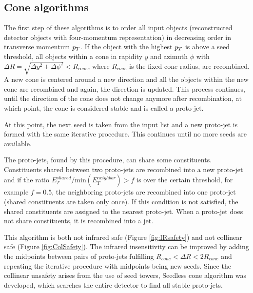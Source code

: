 \subsection{Cone algorithms}

The first step of these algorithms is to order all input objects (reconstructed
detector objects with four-momentum representation) in decreasing order in
transverse momentum $p_{T}$. If the object with the highest $p_{T}$ is above a
seed threshold, all objects within a cone in rapidity $y$ and azimuth
$\phi$ with $\Delta R = \sqrt{\Delta y^2 + \Delta \phi^2} < R_{cone}$, where
$R_{cone}$ is the fixed cone radius, are recombined.
A new cone is centered around a new direction and all the objects within the new
cone are recombined and again, the direction is updated. This process continues,
until the direction of the cone does not change anymore after recombination, at
which point, the cone is considered stable and is called a proto-jet. 

At this point, the next seed is taken from the input list and a new proto-jet is
formed with the same iterative procedure. This continues until no more seeds are
available. 

The proto-jets, found by this procedure, can share some constituents. Constituents
shared between two proto-jets are recombined into a new proto-jet and if the ratio
$E_T^{shared} / \text{min} ( E_T^{neighbor} ) > f$ is over the certain
threshold, for example $f = 0.5$, the neighboring proto-jets are recombined into
one proto-jet (shared constituents are taken only once). If this condition is
not satisfied, the shared constituents are assigned to the nearest proto-jet.
When a proto-jet does not share constituents, it is recombined into a jet.

This algorithm is both not infrared safe (Figure \ref{fig:IRsafety}) and not
collinear safe (Figure \ref{fig:ColSafety}). The infrared insensitivity can be
improved by adding the midpoints between pairs of proto-jets fulfilling
$R_{cone} < \Delta R < 2 R_{cone}$ and repeating the iterative procedure with
midpoints being new seeds. Since the collinear unsafety arises from the use of
seed towers, Seedless cone algorithm was developed, which searches the entire
detector to find all stable proto-jets.


